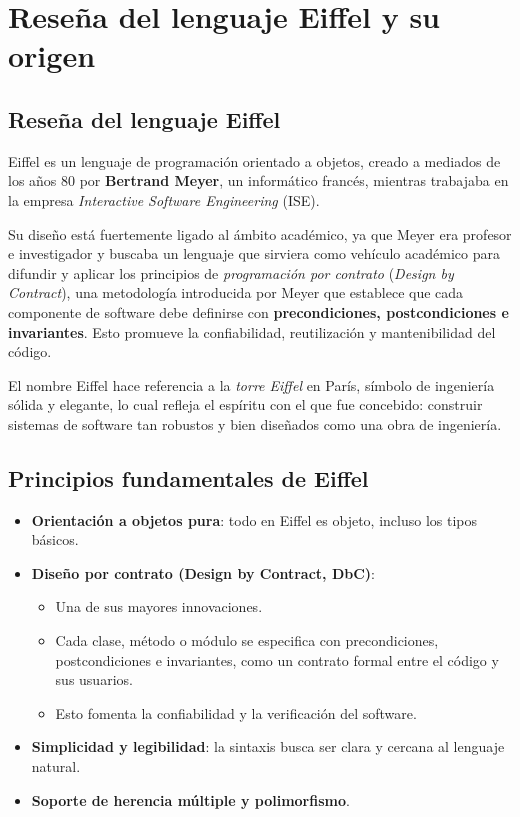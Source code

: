 \documentclass[a4paper,12pt]{article}
\begin{document}
\vspace{6mm}
\section{Reseña del lenguaje Eiffel y su origen}
\vspace{4mm}

\subsection{Reseña del lenguaje Eiffel}

Eiffel es un lenguaje de programación orientado a objetos, creado a mediados de
los años 80 por \textbf{Bertrand Meyer}, un informático francés, mientras
trabajaba en la empresa \textit{Interactive Software Engineering} (ISE).

\noindent
Su diseño está fuertemente ligado al ámbito académico, ya que Meyer era
profesor e
investigador y buscaba un lenguaje que sirviera como vehículo académico para
difundir y aplicar los principios de \textit{programación por contrato}
(\textit{Design by Contract}), una metodología introducida por Meyer que
establece que cada componente de software debe definirse con
\textbf{precondiciones, postcondiciones e invariantes}. Esto promueve la
confiabilidad, reutilización y mantenibilidad del código.

\noindent
El nombre Eiffel hace referencia a la \textit{torre Eiffel} en París, símbolo
de ingeniería sólida y elegante, lo cual refleja el espíritu con el que fue
concebido: construir sistemas de software tan robustos y bien diseñados como
una obra de ingeniería.

\subsection{Principios fundamentales de Eiffel}

\begin{itemize}
    \item \textbf{Orientación a objetos pura}: todo en Eiffel es objeto,
          incluso los tipos básicos.
    \item \textbf{Diseño por contrato (Design by Contract, DbC)}:
          \begin{itemize}
              \item Una de sus mayores innovaciones.
              \item Cada clase, método o módulo se especifica con
                    precondiciones,
                    postcondiciones e invariantes, como un contrato formal
                    entre el código y sus
                    usuarios.
              \item Esto fomenta la confiabilidad y la verificación del
                    software.
          \end{itemize}
    \item \textbf{Simplicidad y legibilidad}: la sintaxis busca ser clara y
          cercana al lenguaje natural.
    \item \textbf{Soporte de herencia múltiple y polimorfismo}.
\end{itemize}
\end{document}
